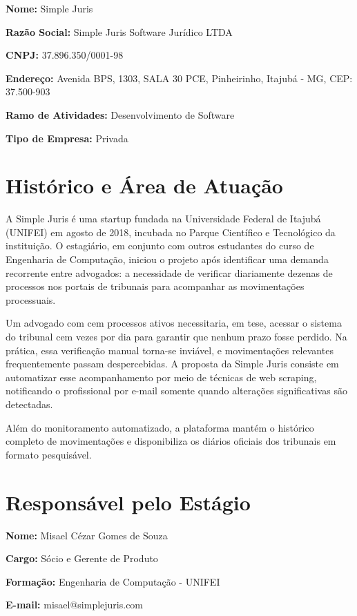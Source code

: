 \documentclass[
	12pt,
	oneside,
	a4paper,
	brazil,
	sumario=tradicional
]{abntex2}
\begin{document}
\noindent\textbf{Nome:} Simple Juris

\noindent\textbf{Razão Social:} Simple Juris Software Jurídico LTDA

\noindent\textbf{CNPJ:} 37.896.350/0001-98

\noindent\textbf{Endereço:} Avenida BPS, 1303, SALA 30 PCE, Pinheirinho, Itajubá - MG, CEP: 37.500-903

\noindent\textbf{Ramo de Atividades:} Desenvolvimento de Software

\noindent\textbf{Tipo de Empresa:} Privada

\section{Histórico e Área de Atuação}

A Simple Juris é uma startup fundada na Universidade Federal de Itajubá (UNIFEI) em agosto de 2018, incubada no Parque Científico e Tecnológico da instituição. O estagiário, em conjunto com outros estudantes do curso de Engenharia de Computação, iniciou o projeto após identificar uma demanda recorrente entre advogados: a necessidade de verificar diariamente dezenas de processos nos portais de tribunais para acompanhar as movimentações processuais.

Um advogado com cem processos ativos necessitaria, em tese, acessar o sistema do tribunal cem vezes por dia para garantir que nenhum prazo fosse perdido. Na prática, essa verificação manual torna-se inviável, e movimentações relevantes frequentemente passam despercebidas. A proposta da Simple Juris consiste em automatizar esse acompanhamento por meio de técnicas de web scraping, notificando o profissional por e-mail somente quando alterações significativas são detectadas.

Além do monitoramento automatizado, a plataforma mantém o histórico completo de movimentações e disponibiliza os diários oficiais dos tribunais em formato pesquisável.

\section{Responsável pelo Estágio}

\noindent\textbf{Nome:} Misael Cézar Gomes de Souza

\noindent\textbf{Cargo:} Sócio e Gerente de Produto

\noindent\textbf{Formação:} Engenharia de Computação - UNIFEI

\noindent\textbf{E-mail:} misael@simplejuris.com
\end{document}
